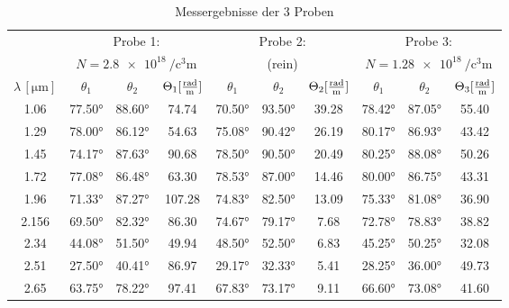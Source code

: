 \begin{table}[H]
	\centering
	\caption{Messergebnisse der 3 Proben}
	\begin{tabular}{|c|c c c|c c c|c c c|}
		\toprule
		& \multicolumn{3}{|c|}{Probe 1:}  & \multicolumn{3}{|c|}{Probe 2:}  & \multicolumn{3}{|c|}{Probe 3:}   \\
        & \multicolumn{3}{|c|}{$N=\qty[per-mode=fraction]{2.8e18}{\per\cubic\centi\meter} $}  
        & \multicolumn{3}{|c|}{(rein)}  & \multicolumn{3}{|c|}{$N=\qty[per-mode=fraction]{1.28e18}{\per\cubic\centi\meter} $}   \\
        \midrule
        $\lambda \, [\unit{\micro\meter}] $ & $\theta_1$ & $\theta_2 $ &$\Theta_1 [\unit[per-mode=fraction]{\radian\per\meter}]$  
        & $\theta_1 $ & $ \theta_2 $ &$\Theta_2 [\unit[per-mode=fraction]{\radian\per\meter}]$ 
        & $\theta_1 $ & $ \theta_2 $ &$\Theta_3 [\unit[per-mode=fraction]{\radian\per\meter}]$\\
		\midrule
            \num{1.06} & \num{77.50}° & \num{88.60}° & \num{74.74} & \num{70.50}° & \num{93.50}° & \num{39.28} & \num{78.42}° & \num{87.05}° & \num{55.40} \\
            \num{1.29} & \num{78.00}° & \num{86.12}° & \num{54.63} & \num{75.08}° & \num{90.42}° & \num{26.19} & \num{80.17}° & \num{86.93}° & \num{43.42} \\
            \num{1.45} & \num{74.17}° & \num{87.63}° & \num{90.68} & \num{78.50}° & \num{90.50}° & \num{20.49} & \num{80.25}° & \num{88.08}° & \num{50.26} \\
            \num{1.72} & \num{77.08}° & \num{86.48}° & \num{63.30} & \num{78.53}° & \num{87.00}° & \num{14.46} & \num{80.00}° & \num{86.75}° & \num{43.31} \\
            \num{1.96} & \num{71.33}° & \num{87.27}° & \num{107.28}& \num{74.83}° & \num{82.50}° & \num{13.09} & \num{75.33}° & \num{81.08}° & \num{36.90} \\
            \num{2.156}& \num{69.50}° & \num{82.32}° & \num{86.30} & \num{74.67}° & \num{79.17}° & \num{7.68}  & \num{72.78}° & \num{78.83}° & \num{38.82} \\
            \num{2.34} & \num{44.08}° & \num{51.50}° & \num{49.94} & \num{48.50}° & \num{52.50}° & \num{6.83}  & \num{45.25}° & \num{50.25}° & \num{32.08} \\
            \num{2.51} & \num{27.50}° & \num{40.41}° & \num{86.97} & \num{29.17}° & \num{32.33}° & \num{5.41}  & \num{28.25}° & \num{36.00}° & \num{49.73} \\
            \num{2.65} & \num{63.75}° & \num{78.22}° & \num{97.41} & \num{67.83}° & \num{73.17}° & \num{9.11}  & \num{66.60}° & \num{73.08}° & \num{41.60} \\
		\bottomrule
	\end{tabular}
	\label{tab:data}
\end{table}


